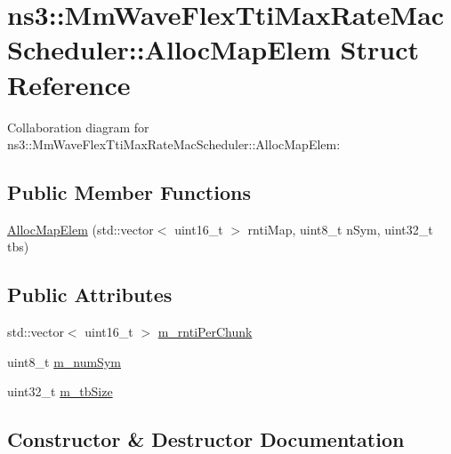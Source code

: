 \hypertarget{structns3_1_1MmWaveFlexTtiMaxRateMacScheduler_1_1AllocMapElem}{}\section{ns3\+:\+:Mm\+Wave\+Flex\+Tti\+Max\+Rate\+Mac\+Scheduler\+:\+:Alloc\+Map\+Elem Struct Reference}
\label{structns3_1_1MmWaveFlexTtiMaxRateMacScheduler_1_1AllocMapElem}


Collaboration diagram for ns3\+:\+:Mm\+Wave\+Flex\+Tti\+Max\+Rate\+Mac\+Scheduler\+:\+:Alloc\+Map\+Elem\+:
\subsection*{Public Member Functions}
\begin{DoxyCompactItemize}
\item 
\hyperlink{structns3_1_1MmWaveFlexTtiMaxRateMacScheduler_1_1AllocMapElem_a86c74af680ac0a9a1a68740cf9cb5ba5}{Alloc\+Map\+Elem} (std\+::vector$<$ uint16\+\_\+t $>$ rnti\+Map, uint8\+\_\+t n\+Sym, uint32\+\_\+t tbs)
\end{DoxyCompactItemize}
\subsection*{Public Attributes}
\begin{DoxyCompactItemize}
\item 
std\+::vector$<$ uint16\+\_\+t $>$ \hyperlink{structns3_1_1MmWaveFlexTtiMaxRateMacScheduler_1_1AllocMapElem_a83d0a705ba98540bcf9293fbb42ffed1}{m\+\_\+rnti\+Per\+Chunk}
\item 
uint8\+\_\+t \hyperlink{structns3_1_1MmWaveFlexTtiMaxRateMacScheduler_1_1AllocMapElem_a659c5bd4b7fb615313f4b9c97879e868}{m\+\_\+num\+Sym}
\item 
uint32\+\_\+t \hyperlink{structns3_1_1MmWaveFlexTtiMaxRateMacScheduler_1_1AllocMapElem_a1fc02ffdf7cd5577c5221f4797d75f8c}{m\+\_\+tb\+Size}
\end{DoxyCompactItemize}


\subsection{Constructor \& Destructor Documentation}
